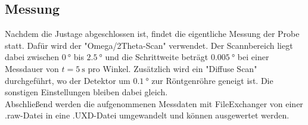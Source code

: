 \subsection{Messung}
Nachdem die Justage abgeschlossen ist, findet die eigentliche Messung der Probe statt. Dafür wird der "Omega/2Theta-Scan" verwendet. Der Scannbereich liegt dabei zwischen $\SI{0}{\degree}$ bis $\SI{2.5}{\degree}$ und die Schrittweite beträgt $\SI{0.005}{\degree}$ bei einer Messdauer von $t=\SI{5}{\second}$ pro Winkel. Zusätzlich wird ein  "Diffuse Scan" durchgeführt, wo der Detektor um $\SI{0.1}{\degree}$ zur Röntgenröhre geneigt ist. Die sonstigen Einstellungen bleiben dabei gleich. \\
Abschließend werden die aufgenommenen Messdaten mit FileExchanger von einer .raw-Datei in eine .UXD-Datei umgewandelt und können ausgewertet werden.
